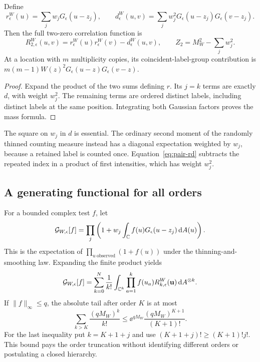 \begin{proposition}\label{prop:weighted-pair}
Define
\begin{equation}\label{eq:r-and-d}
 r_\epsilon^W(u)=\sum_j w_jG_\epsilon(u-z_j),\qquad
 d_\epsilon^W(u,v)=\sum_jw_j^2G_\epsilon(u-z_j)G_\epsilon(v-z_j).
\end{equation}
Then the full two-zero correlation function is
\begin{equation}\label{eq:pair-rd}
 R_{2,\epsilon}^W(u,v)
       =r_\epsilon^W(u)r_\epsilon^W(v)-d_\epsilon^W(u,v),
 \qquad Z_2=M_W^2-\sum_jw_j^2.
\end{equation}
At a location with $m$ multiplicity copies, its coincident-label-group
contribution is $m(m-1)W(z)^2G_\epsilon(u-z)G_\epsilon(v-z)$.
\end{proposition}
\begin{proof}
Expand the product of the two sums defining $r$. Its $j=k$ terms
are exactly $d$, with weight $w_j^2$. The remaining terms are ordered
distinct labels, including distinct labels at the same position.
Integrating both Gaussian factors proves the mass formula.
\end{proof}

The square on $w_j$ in $d$ is essential. The ordinary second moment
of the randomly thinned counting measure instead has a diagonal
expectation weighted by $w_j$, because a retained label is counted once.
Equation~\eqref{eq:pair-rd} subtracts the repeated index in a product
of first intensities, which has weight $w_j^2$.

\subsection{A generating functional for all orders}

For a bounded complex test $f$, let
\begin{equation}\label{eq:full-pgfl}
 \mathcal G_{W,\epsilon}[f]
  =\prod_j\left(1+w_j\int_\mathbb C f(u)G_\epsilon(u-z_j)\,\mathrm d A(u)\right).
\end{equation}
This is the expectation of $\prod_{u\ \mathrm{observed}}(1+f(u))$ under
the thinning-and-smoothing law. Expanding the finite product yields
\begin{equation}\label{eq:pgfl-expansion}
 \mathcal G_{W,\epsilon}[f]
  =\sum_{k=0}^N\frac1{k!}
      \int_{\mathbb C^k}\prod_{a=1}^k f(u_a)
                       R_{k,\epsilon}^W(\mathbf u)\,\mathrm d A^{\otimes k}.
\end{equation}
If $\|f\|_\infty\le q$, the absolute tail after order $K$ is at most
\begin{equation}\label{eq:order-tail-full}
 \sum_{k>K}\frac{(qM_W)^k}{k!}
       \le \ee^{qM_W}\frac{(qM_W)^{K+1}}{(K+1)!}.
\end{equation}
For the last inequality put $k=K+1+j$ and use
$(K+1+j)!\ge(K+1)!j!$. This bound pays the order truncation
without identifying different orders or postulating a closed hierarchy.

